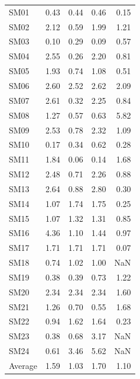 \documentclass[9pt,lineno]{elife}
\begin{document}
\begin{table}[H]
\begin{tabular}{lrrrr}
\midrule
    SM01 &       0.43 &        0.44 &         0.46 &         0.15 \\
    SM02 &       2.12 &        0.59 &         1.99 &         1.21 \\
    SM03 &       0.10 &        0.29 &         0.09 &         0.57 \\
    SM04 &       2.55 &        0.26 &         2.20 &         0.81 \\
    SM05 &       1.93 &        0.74 &         1.08 &         0.51 \\
    SM06 &       2.60 &        2.52 &         2.62 &         2.09 \\
    SM07 &       2.61 &        0.32 &         2.25 &         0.84 \\
    SM08 &       1.27 &        0.57 &         0.63 &         5.82 \\
    SM09 &       2.53 &        0.78 &         2.32 &         1.09 \\
    SM10 &       0.17 &        0.34 &         0.62 &         0.28 \\
    SM11 &       1.84 &        0.06 &         0.14 &         1.68 \\
    SM12 &       2.48 &        0.71 &         2.26 &         0.88 \\
    SM13 &       2.64 &        0.88 &         2.80 &         0.30 \\
    SM14 &       1.07 &        1.74 &         1.75 &         0.25 \\
    SM15 &       1.07 &        1.32 &         1.31 &         0.85 \\
    SM16 &       4.36 &        1.10 &         1.44 &         0.97 \\
    SM17 &       1.71 &        1.71 &         1.71 &         0.07 \\
    SM18 &       0.74 &        1.02 &         1.00 &          NaN \\
    SM19 &       0.38 &        0.39 &         0.73 &         1.22 \\
    SM20 &       2.34 &        2.34 &         2.34 &         1.60 \\
    SM21 &       1.26 &        0.70 &         0.55 &         1.68 \\
    SM22 &       0.94 &        1.62 &         1.64 &         0.23 \\
    SM23 &       0.38 &        0.68 &         3.17 &         NaN \\
    SM24 &       0.61 &        3.46 &         5.62 &         NaN \\
    \midrule
    Average &       1.59 &        1.03 &         1.70 &         1.10 \\
\bottomrule\end{tabular}
    
\end{table}
\end{document}
